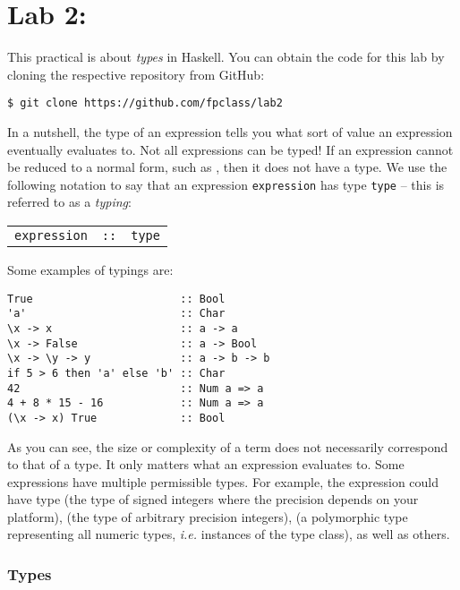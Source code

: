 \section{Lab 2: \practicalTwoTitle}

This practical is about \emph{types} in Haskell. You can obtain the code for this lab by cloning the respective repository from GitHub:
\begin{verbatim}
$ git clone https://github.com/fpclass/lab2
\end{verbatim}
In a nutshell, the type of an expression tells you what sort of value an expression eventually evaluates to. Not all expressions can be typed! If an expression cannot be reduced to a normal form, such as , then it does not have a type. We use the following notation to say that an expression \texttt{\small expression} has type \texttt{\small type} -- this is referred to as a \emph{typing}:
\begin{center}
	\begin{tabular}{lcl}
		\texttt{\small expression} & \texttt{\small ::} & \texttt{\small type}
	\end{tabular}
\end{center}
Some examples of typings are:
\begin{verbatim}
True                       :: Bool
'a'                        :: Char 
\x -> x                    :: a -> a
\x -> False                :: a -> Bool 
\x -> \y -> y              :: a -> b -> b
if 5 > 6 then 'a' else 'b' :: Char 
42                         :: Num a => a
4 + 8 * 15 - 16            :: Num a => a
(\x -> x) True             :: Bool
\end{verbatim}
As you can see, the size or complexity of a term does not necessarily correspond to that of a type. It only matters what an expression evaluates to. Some expressions have multiple permissible types. For example, the expression  could have type  (the type of signed integers where the precision depends on your platform),  (the type of arbitrary precision integers),  (a polymorphic type representing all numeric types, \emph{i.e.} instances of the  type class), as well as others.

\subsubsection{Types}

